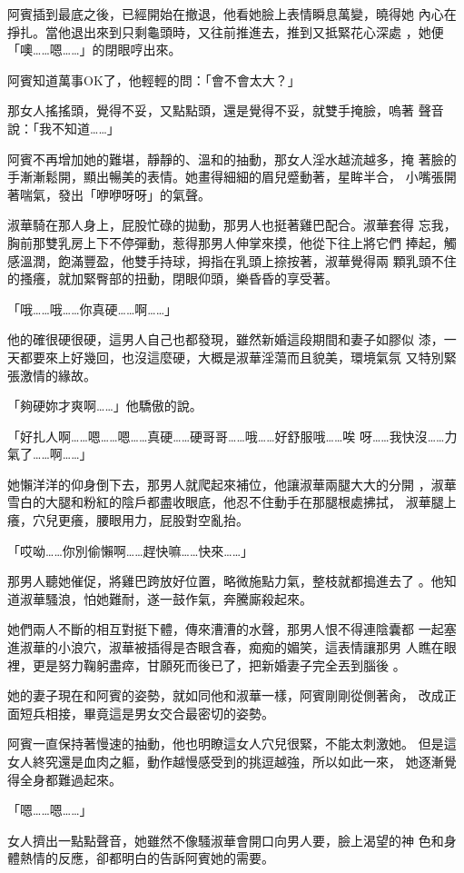 阿賓插到最底之後，已經開始在撤退，他看她臉上表情瞬息萬變，曉得她
內心在掙扎。當他退出來到只剩龜頭時，又往前推進去，推到又抵緊花心深處
，她便「噢……嗯……」的閉眼哼出來。

阿賓知道萬事OK了，他輕輕的問：「會不會太大？」

那女人搖搖頭，覺得不妥，又點點頭，還是覺得不妥，就雙手掩臉，嗚著
聲音說：「我不知道……」

阿賓不再增加她的難堪，靜靜的、溫和的抽動，那女人淫水越流越多，掩
著臉的手漸漸鬆開，顯出暢美的表情。她畫得細細的眉兒蹙動著，星眸半合，
小嘴張開著喘氣，發出「咿咿呀呀」的氣聲。

淑華騎在那人身上，屁股忙碌的拋動，那男人也挺著雞巴配合。淑華套得
忘我，胸前那雙乳房上下不停彈動，惹得那男人伸掌來摸，他從下往上將它們
捧起，觸感溫潤，飽滿豐盈，他雙手持球，拇指在乳頭上捺按著，淑華覺得兩
顆乳頭不住的搔癢，就加緊臀部的扭動，閉眼仰頭，樂昏昏的享受著。

「哦……哦……你真硬……啊……」

他的確很硬很硬，這男人自己也都發現，雖然新婚這段期間和妻子如膠似
漆，一天都要來上好幾回，也沒這麼硬，大概是淑華淫蕩而且貌美，環境氣氛
又特別緊張激情的緣故。

「夠硬妳才爽啊……」他驕傲的說。

「好扎人啊……嗯……嗯……真硬……硬哥哥……哦……好舒服哦……唉
呀……我快沒……力氣了……啊……」

她懶洋洋的仰身倒下去，那男人就爬起來補位，他讓淑華兩腿大大的分開
，淑華雪白的大腿和粉紅的陰戶都盡收眼底，他忍不住動手在那腿根處拂拭，
淑華腿上癢，穴兒更癢，腰眼用力，屁股對空亂抬。

「哎呦……你別偷懶啊……趕快嘛……快來……」

那男人聽她催促，將雞巴跨放好位置，略微施點力氣，整枝就都搗進去了
。他知道淑華騷浪，怕她難耐，遂一鼓作氣，奔騰廝殺起來。

她們兩人不斷的相互對挺下體，傳來漕漕的水聲，那男人恨不得連陰囊都
一起塞進淑華的小浪穴，淑華被插得是杏眼含春，痴痴的媚笑，這表情讓那男
人瞧在眼裡，更是努力鞠躬盡瘁，甘願死而後已了，把新婚妻子完全丟到腦後
。

她的妻子現在和阿賓的姿勢，就如同他和淑華一樣，阿賓剛剛從側著肏，
改成正面短兵相接，畢竟這是男女交合最密切的姿勢。

阿賓一直保持著慢速的抽動，他也明瞭這女人穴兒很緊，不能太刺激她。
但是這女人終究還是血肉之軀，動作越慢感受到的挑逗越強，所以如此一來，
她逐漸覺得全身都難過起來。

「嗯……嗯……」

女人擠出一點點聲音，她雖然不像騷淑華會開口向男人要，臉上渴望的神
色和身體熱情的反應，卻都明白的告訴阿賓她的需要。

